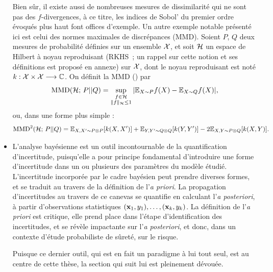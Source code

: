 \begin{itemize}
    Bien sûr, il existe aussi de nombreuses mesures de dissimilarité qui ne sont pas des $f$-divergences, à ce titre, les indices de Sobol' du premier ordre évoqués plus haut font offices d'exemple. Un autre exemple notable présenté ici est celui des normes maximales de discrépances (MMD). Soient $P$, $Q$ deux mesures de probabilité définies sur un ensemble $\mathcal{X}$, et soit $\mathcal{H}$ un espace de Hilbert à noyau reproduisant (RKHS~; un rappel sur cette notion et ses définitions est proposé en annexe) sur $\mathcal{X}$,  dont le noyau reproduisant est noté $k:\mathcal{X}\times\mathcal{X}\longrightarrow\mathbb{C}$. %
    On définit la MMD (\cite{gretton_kernel_2012}) par
        \begin{equation}
            \text{MMD}(\mathcal{H};\,P||Q) = \sup_{\substack{f\in\mathcal{H}\\ \|f\|_{\mathcal{H}}\leq1}} |\mathbb{E}_{X\sim P}f(X) - \mathbb{E}_{X\sim Q}f(X)|,
        \end{equation}
    ou, dans une forme plus simple :
        \begin{equation}
            \text{MMD}^2(\mathcal{H};\,P||Q) = \mathbb{E}_{X,X'\sim P\otimes P}[k(X,X')] + \mathbb{E}_{Y,Y'\sim Q\otimes Q}[k(Y,Y')] - 2\mathbb{E}_{X,Y\sim P\otimes Q}[k(X,Y)].
        \end{equation}
    \item L'analyse bayésienne est un outil incontournable de la quantification d'incertitude, puisqu'elle a pour principe fondamental d'introduire une forme d'incertitude dans un ou plusieurs des paramètres du modèle étudié. 
    L'incertitude incorporée par le cadre bayésien peut prendre diverses formes, et se traduit au travers de la définition de l'\emph{a priori}. 
    La propagation d'incertitudes au travers de ce canevas se quantifie en calculant l'\emph{a posteriori}, à partir d'observations statistiques $(\mathbf{x}_1,y_1),\dots,(\mathbf{x}_k, y_k)$.
    La définition de l'\emph{a priori} est critique, elle prend place dans l'étape d'identification des incertitudes, et se révèle impactante sur l'\emph{a posteriori}, et donc, dans un contexte d'étude probabiliste de sûreté, sur le risque.
    
    Puisque ce dernier outil, qui est en fait un paradigme à lui tout seul, est au centre de cette thèse, la section qui suit lui est pleinement dévouée.
\end{itemize}
















